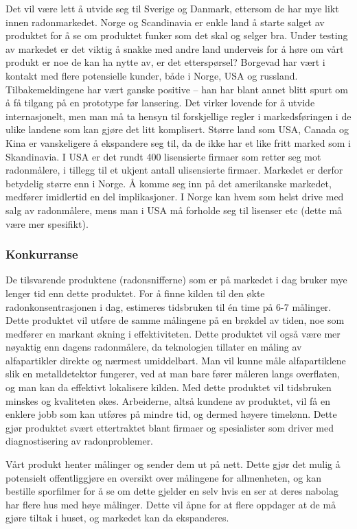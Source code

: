 Det vil være lett å utvide seg til Sverige og Danmark, ettersom de har mye likt innen radonmarkedet. Norge og Scandinavia er enkle land å starte salget av produktet for å se om produktet funker som det skal og selger bra. Under testing av markedet er det viktig å snakke med andre land underveis for å høre om vårt produkt er noe de kan ha nytte av, er det etterspørsel? 
Borgevad har vært i kontakt med flere potensielle kunder, både i Norge, USA og russland.
Tilbakemeldingene har vært ganske positive – han har blant annet blitt spurt om å få tilgang på en prototype før lansering.
Det virker lovende for å utvide internasjonelt, men man må ta hensyn til forskjellige regler i markedsføringen i de ulike landene som kan gjøre det litt komplisert. 
Større land som USA, Canada og Kina er vanskeligere å ekspandere seg til, da de ikke har et like fritt marked som i Skandinavia.
I USA er det rundt 400 lisensierte firmaer som retter seg mot radonmålere, i tillegg til et ukjent antall ulisensierte firmaer.
Markedet er derfor betydelig større enn i Norge.
Å komme seg inn på det amerikanske markedet, medfører imidlertid en del implikasjoner.
I Norge kan hvem som helst drive med salg av radonmålere, mens man i USA må forholde seg til lisenser etc (dette må være mer spesifikt).

\subsubsection{Konkurranse}

De tilsvarende produktene (radonsnifferne) som er på markedet i dag bruker mye lenger tid enn dette produktet. For å finne kilden til den økte radonkonsentrasjonen i dag, estimeres tidsbruken til én time på 6-7 målinger. Dette produktet vil utføre de samme målingene på en brøkdel av tiden, noe som medfører en markant økning i effektiviteten. Dette produktet vil også være mer nøyaktig enn dagens radonmålere, da teknologien tillater en måling av alfapartikler direkte og nærmest umiddelbart. Man vil kunne måle alfapartiklene slik en metalldetektor fungerer, ved at man bare fører måleren langs overflaten, og man kan da effektivt lokalisere kilden. Med dette produktet vil tidsbruken minskes og kvaliteten økes. Arbeiderne, altså kundene av produktet, vil få en enklere jobb som kan utføres på mindre tid, og dermed høyere timelønn. Dette gjør produktet svært ettertraktet blant firmaer og spesialister som driver med diagnostisering av radonproblemer.

Vårt produkt henter målinger og sender dem ut på nett. Dette gjør det mulig å potensielt offentliggjøre en oversikt over målingene for allmenheten, og kan bestille sporfilmer for å se om dette gjelder en selv hvis en ser at deres nabolag har flere hus med høye målinger. Dette vil åpne for at flere oppdager at de må gjøre tiltak i huset, og markedet kan da ekspanderes.

